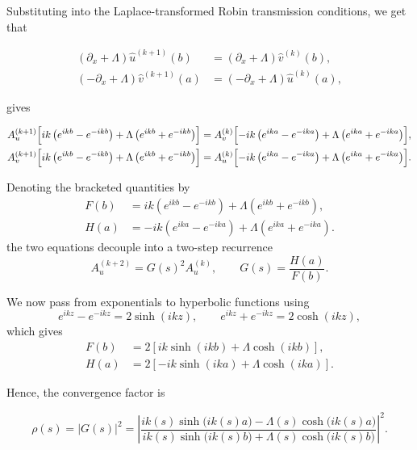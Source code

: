\documentclass{Configuration_Files/PoliMi3i_thesis}
\begin{document}
Substituting into the Laplace-transformed Robin transmission conditions, we get that

\begin{align*}
(\partial_x+\Lambda)\widehat{u}^{(k+1)}(b)
&=
(\partial_x+\Lambda)\widehat{v}^{(k)}(b),
\\
(-\partial_x+\Lambda)\widehat{v}^{(k+1)}(a)
&=
(-\partial_x+\Lambda)\widehat{u}^{(k)}(a),
\end{align*}

gives

\begin{align*}
A_u^{(k+1)}
\Bigl[
ik\left(e^{ikb}-e^{-ikb}\right)
+\Lambda\left(e^{ikb}+e^{-ikb}\right)
\Bigr]
&=
A_v^{(k)}
\Bigl[
-ik\left(e^{ika}-e^{-ika}\right)
+\Lambda\left(e^{ika}+e^{-ika}\right)
\Bigr],
\\
A_v^{(k+1)}
\Bigl[
ik\left(e^{ikb}-e^{-ikb}\right)
+\Lambda\left(e^{ikb}+e^{-ikb}\right)
\Bigr]
&=
A_u^{(k)}
\Bigl[
-ik\left(e^{ika}-e^{-ika}\right)
+\Lambda\left(e^{ika}+e^{-ika}\right)
\Bigr].
\end{align*}

Denoting the bracketed quantities by
\[
\begin{aligned}
F(b) &= ik\left(e^{ikb}-e^{-ikb}\right)+\Lambda\left(e^{ikb}+e^{-ikb}\right),\\
H(a) &= -ik\left(e^{ika}-e^{-ika}\right)+\Lambda\left(e^{ika}+e^{-ika}\right).
\end{aligned}
\]
the two equations decouple into a two-step recurrence
\begin{equation*}
A_u^{(k+2)} = G(s)^2 A_u^{(k)},
\qquad
G(s) = \frac{H(a)}{F(b)}.
\end{equation*}

We now pass from exponentials to hyperbolic functions using
\[
e^{ikz}-e^{-ikz}=2\sinh(ikz),
\qquad
e^{ikz}+e^{-ikz}=2\cosh(ikz),
\]
which gives
\begin{align*}
F(b) &= 2\left[ik\sinh(ikb)+\Lambda\cosh(ikb)\right], \\
H(a) &= 2\left[-ik\sinh(ika)+\Lambda\cosh(ika)\right].
\end{align*}

Hence, the convergence factor is

\begin{equation*}
\rho(s)
=
|G(s)|^2
=
\left|
\frac{
ik(s)\sinh\bigl(ik(s)a\bigr)
-
\Lambda(s)\cosh\bigl(ik(s)a\bigr)
}{
ik(s)\sinh\bigl(ik(s)b\bigr)
+
\Lambda(s)\cosh\bigl(ik(s)b\bigr)
}
\right|^2.
\end{equation*}
\end{document}
